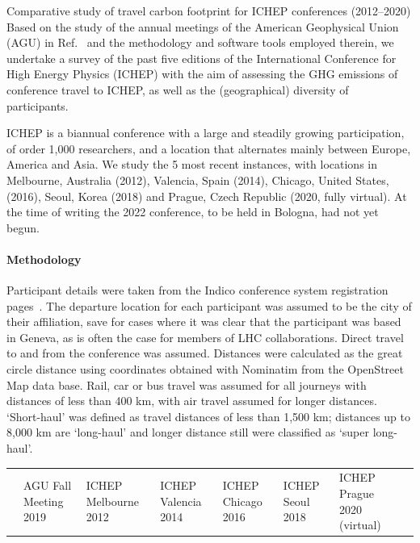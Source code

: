 \documentclass[../SustainableHEP.tex]{subfiles}
\begin{document}
\begin{casestudy}{Comparative study of travel carbon footprint for ICHEP conferences (2012--2020)}%
Based on the study of the annual meetings of the American Geophysical Union (AGU) in Ref.~\cite{RefAGU} and the methodology and software tools employed therein, we undertake a survey of the past five editions of the International Conference for High Energy Physics (ICHEP) with the aim of assessing the GHG emissions of conference travel to ICHEP, as well as the (geographical) diversity of participants.

ICHEP is a biannual conference with a large and steadily growing participation, of order 1,000 researchers, and a location that alternates mainly between Europe, America and Asia.  We study the 5 most recent instances, with locations in Melbourne, Australia (2012), Valencia, Spain (2014), Chicago, United States, (2016), Seoul, Korea (2018) and Prague, Czech Republic (2020, fully virtual).  At the time of writing the 2022 conference, to be held in Bologna, had not yet begun.

\paragraph{Methodology}

Participant details were taken from the Indico conference system registration pages~\cite{indico}. The departure location for each participant was assumed to be the city of their affiliation, save for cases where it was clear that the participant was based in Geneva, as is often the case for members of LHC collaborations. Direct travel to and from the conference was assumed.  Distances were calculated as the great circle distance using coordinates obtained with Nominatim from the OpenStreet Map data base. Rail, car or bus travel was assumed for all journeys with distances of less than 400 km, with air travel assumed for longer distances.  `Short-haul' was defined as travel distances of less than 1,500 km; distances up to 8,000 km are `long-haul' and longer distance still were classified as `super long-haul'.

\begin{center}
{\scriptsize
{}
\captionsetup{type=table}
\caption[Total number of participants of recent ICHEP conferences and the GHG emissions per participant]{Total number of participants of recent ICHEP conferences and the GHG emissions per participant.
The corresponding numbers for the AGU Fall Meeting~\cite{RefAGU} are shown for reference.}
\label{tab:icheppart}
\begin{tabular}{@{}p{2.3cm}>{\baselineskip=10pt}p{1.8cm}>{\baselineskip=10pt}p{1.5cm}>{\baselineskip=10pt}p{1.5cm}>{\baselineskip=10pt}p{1.5cm}>{\baselineskip=10pt}p{1.4cm}>{\baselineskip=10pt}p{1.7cm}c@{}}\toprule
&AGU Fall Meeting 2019 & 
ICHEP Melbourne 2012 & 
ICHEP Valencia 2014 &
ICHEP Chicago 2016 & 
ICHEP Seoul 2018 &         
ICHEP Prague 2020 (virtual) \\ \cmidrule{2-7}
    

\end{tabular}}
\end{center}
\end{casestudy}
\end{document}
